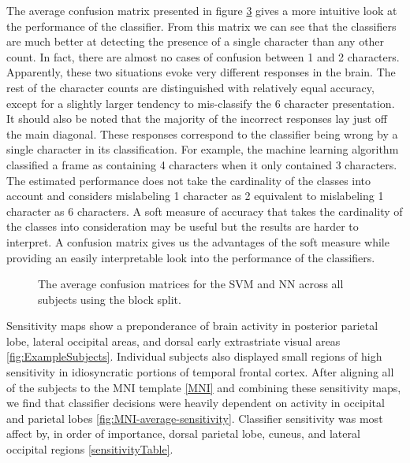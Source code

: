 \documentclass[preprint,5p,authoryear]{elsarticle}
\begin{document}
\begin{table}
The average confusion matrix presented in figure \ref{fig:average-confusion} gives a more intuitive look at the performance of the classifier.
From this matrix we can see that the classifiers are much better at detecting the presence of a single character than any other count.
In fact, there are almost no cases of confusion between 1 and 2 characters.
Apparently, these two situations evoke very different responses in the brain.
The rest of the character counts are distinguished with relatively equal accuracy,
except for a slightly larger tendency to mis-classify the 6 character presentation.
It should also be noted that the majority of the incorrect responses lay just off the main diagonal.
These responses correspond to the classifier being wrong by a single character in its classification.
For example, the machine learning algorithm classified a frame as containing 4 characters when it only contained 3 characters.
The estimated performance does not take the cardinality of the classes into account and considers mislabeling 1 character as 2 equivalent to mislabeling 1 character as 6 characters.
A soft measure of accuracy that takes the cardinality of the classes into consideration may be useful but the results are harder to interpret.
A confusion matrix gives us the advantages of the soft measure while providing an easily interpretable look into the performance of the classifiers.

\begin{figure}
\centering
\begin{subfigure}{0.4\textwidth}
\centering

\caption{}
\label{fig:average-confusion-svm}
\end{subfigure}
\begin{subfigure}{0.4\textwidth}
\centering

\caption{}
\label{fig:average-confusion-nn}
\end{subfigure}
\caption{The average confusion matrices for the  SVM and  NN across all subjects using the block split.}
\label{fig:average-confusion}
\end{figure}

Sensitivity maps show a preponderance of brain activity in posterior parietal lobe, lateral occipital areas, and dorsal early extrastriate visual areas \ref{fig:ExampleSubjects}. Individual subjects also displayed small regions of high sensitivity in idiosyncratic portions of temporal frontal cortex. After aligning all of the subjects to the MNI template \ref{MNI} and combining these sensitivity maps, we find that classifier decisions were heavily dependent on activity in occipital and parietal lobes \ref{fig:MNI-average-sensitivity}.  Classifier sensitivity was most affect by, in order of importance, dorsal parietal lobe, cuneus, and lateral occipital regions \ref{sensitivityTable}. 



\end{table}
\end{document}
